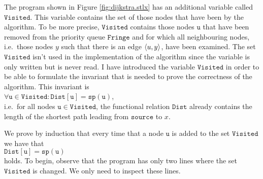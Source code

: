 The program shown in Figure \ref{fig:dijkstra.stlx} has an additional variable called $\mathtt{Visited}$.
This variable contains the set of those nodes that have been   by the algorithm.
To be more precise, $\mathtt{Visited}$ contains those nodes $\mathtt{u}$ that have been removed from the
priority queue $\mathtt{Fringe}$ and for which all neighbouring nodes, i.e.~those nodes $y$ such that
there is an edge $\pair(u,y)$, have been examined.
The set $\mathtt{Visited}$ isn't used in the implementation of the algorithm since the variable is
only written but is never read.
I have introduced the variable $\mathtt{Visited}$ in order to be able to formulate the invariant that
is needed to prove the correctness of the algorithm.  This invariant is
\\[0.2cm]
\hspace*{1.3cm}
$\forall \mathtt{u}\in\mathtt{Visited}: \mathtt{Dist}[\mathtt{u}] = \mathtt{sp}(\mathtt{u})$,
\\[0.2cm]
i.e.~for all nodes $\mathtt{u} \in \mathtt{Visited}$, the functional relation $\mathtt{Dist}$
already contains the length of the shortest path leading from $\mathtt{source}$ to $x$.  
\vspace*{0.1cm}

\proof 
We prove by induction that every time that a node $\mathtt{u}$ is added to the set
$\mathtt{Visited}$ we have that
\\[0.2cm]
\hspace*{1.3cm}
$\mathtt{Dist}[\mathtt{u}] = \mathtt{sp}(\mathtt{u})$ 
\\[0.2cm]
holds.  To begin, observe that the program has only two lines where the set $\mathtt{Visited}$ is changed.
We only need to inspect these lines.
\pagebreak

